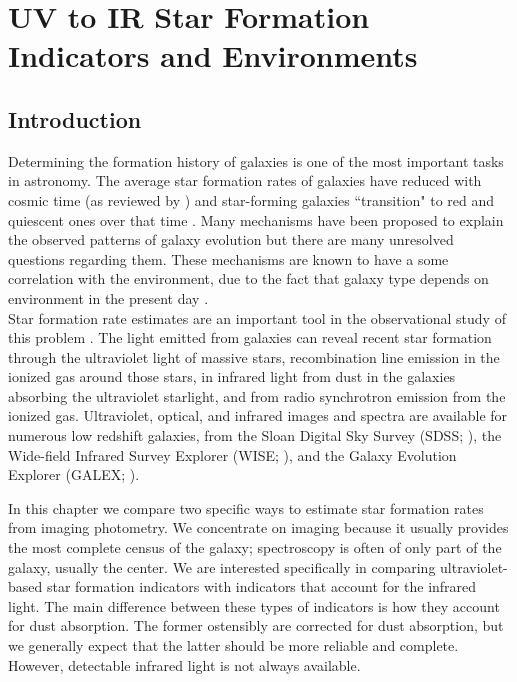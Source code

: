 \chapter{UV to IR Star Formation Indicators and Environments}
\label{ch:sfrk}

\newpage
\section{Introduction}
Determining the formation history of galaxies is one of the most important tasks in astronomy. The average star formation rates of galaxies have reduced with cosmic time (as reviewed by \citealt{madau_cosmic_2014}) and star-forming galaxies ``transition" to red and quiescent ones over that time \citep[\emph{e.g.}][among others]{peng_mass_2010, ilbert_mass_2013, muzzin_evolution_2013, moustakas_primus_2013, tomczak_galaxy_2014}. Many mechanisms have been proposed to explain the observed patterns of galaxy evolution but there are many unresolved questions regarding them. These mechanisms are known to have a some correlation with the environment, due to the fact that galaxy type depends on environment in the present day \citep{dressler_galaxy_1980, blanton_physical_2009-1}.\\

Star formation rate estimates are an important tool in the observational study of this problem \citep{kennicutt_star_2012}. The light emitted from galaxies can reveal recent star formation through the ultraviolet light of massive stars, recombination line emission in the ionized gas around those stars, in infrared light from dust in the galaxies absorbing the ultraviolet starlight, and from radio synchrotron emission from the ionized gas. Ultraviolet, optical, and infrared images and spectra are available for numerous low redshift galaxies, from the Sloan Digital Sky Survey (SDSS; \citealt{york00a}), the Wide-field Infrared Survey Explorer (WISE; \citealt{wright_wide-field_2010}), and the Galaxy Evolution Explorer (GALEX; \citealt{martin05a}).

In this chapter we compare two specific ways to estimate star formation rates from imaging photometry. We concentrate on imaging because it usually provides the most complete census of the galaxy; spectroscopy is often of only part of the galaxy, usually the center. We are interested specifically in comparing ultraviolet-based star formation indicators with indicators that account for the infrared light. The main difference between these types of indicators is how they account for dust absorption. The former ostensibly are corrected for dust absorption, but we generally expect that the latter should be more reliable and complete. However, detectable infrared light is not always available.

